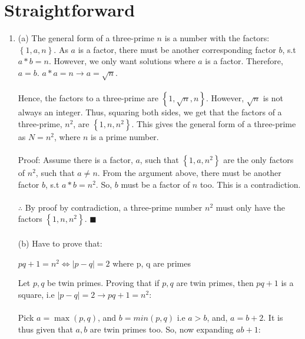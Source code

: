 \documentclass[a4paper]{article}
\begin{document}
\section{Straightforward}
\begin{enumerate}
    \item (a) The general form of a three-prime $n$ is a number with the factors: $\left\{ 1, a, n \right\}$. As $a$ is a factor, there must be another corresponding factor $b$, s.t $a * b = n$. However, we only want solutions where $a$ is a factor. Therefore, $a = b$. $a * a = n \rightarrow a = \sqrt{n}$. \\
    \\ 
    Hence, the factors to a three-prime are $\left\{ 1, \sqrt{n}, n \right\}$. However, $\sqrt{n}$ is not always an integer. Thus, squaring both sides, we get that the factors of a three-prime, $n^2$, are $\left\{ 1, n, n^2 \right\}$. This gives the general form of a three-prime as $N = n^2$, where $n$ is a prime number.\\
    \\
    Proof: Assume there is a factor, $a$, such that $\left\{ 1, a, n^2 \right\}$ are the only factors of $n^2$, such that $a \neq n$. From the argument above, there must be another factor $b$, s.t $a * b = n^2$. So, $b$ must be a factor of $n$ too. This is a contradiction.\\
    \\
    $\therefore$ By proof by contradiction, a three-prime number $n^2$ must only have the factors $\left\{ 1, n, n^2 \right\}$. $\blacksquare$ \\
    \\ 
    (b) Have to prove that:
    \begin{center}
        $pq + 1 = n^2 \Leftrightarrow |p-q| = 2$ where p, q are primes
    \end{center}
    Let $p, q$ be twin primes. Proving that if $p, q$ are twin primes, then $pq + 1$ is a square, i.e $|p-q| = 2 \rightarrow pq + 1 = n^2$:\\
    \\ 
    Pick $a = \max(p, q)$, and $b=min(p, q)$ i.e $a > b$, and, $a = b+2$. It is thus given that $a, b$ are twin primes too. So, now expanding $ab + 1$: 


\end{enumerate}
\end{document}
